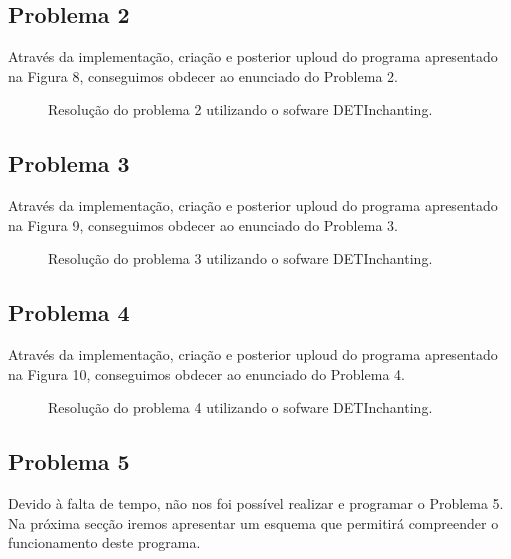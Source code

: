 \documentclass[a4paper, 12pt, onecolumn, oneside]{report}
\begin{document}
\subsection{Problema 2}

Através da implementação, criação e posterior uploud do programa apresentado na Figura 8, conseguimos obdecer ao enunciado do Problema 2.

\begin{figure}[H]
\center{\texttt{[image: ex2]}}
\caption{Resolução do problema 2 utilizando o sofware DETInchanting.}
\label{fig:speciation}
\end{figure}

\subsection{Problema 3}

Através da implementação, criação e posterior uploud do programa apresentado na Figura 9, conseguimos obdecer ao enunciado do Problema 3.

\begin{figure}[H]
\center{\texttt{[image: ex3]}}
\caption{Resolução do problema 3 utilizando o sofware DETInchanting.}
\label{fig:speciation}
\end{figure}

\subsection{Problema 4}

Através da implementação, criação e posterior uploud do programa apresentado na Figura 10, conseguimos obdecer ao enunciado do Problema 4.

\begin{figure}[H]
\center{\texttt{[image: ex4]}}
\caption{Resolução do problema 4 utilizando o sofware DETInchanting.}
\label{fig:speciation}
\end{figure}



\subsection{Problema 5}

Devido à falta de tempo, não nos foi possível realizar e programar o Problema 5. Na próxima secção iremos apresentar um esquema que permitirá compreender o funcionamento deste programa. 
\end{document}

